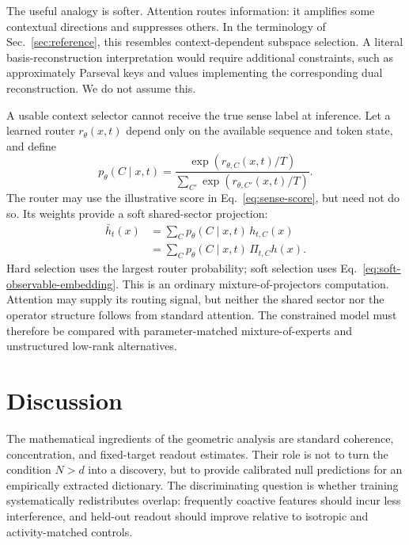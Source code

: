 \documentclass[
  aps,
  reprint,
  superscriptaddress,
  floatfix,
  nofootinbib,
  longbibliography
]{revtex4-2}
\newcommand{\Nsem}{N}
\begin{document}
The useful analogy is softer. Attention routes information: it amplifies
some contextual directions and suppresses others. In the terminology of
Sec.~\ref{sec:reference}, this resembles context-dependent subspace
selection. A literal basis-reconstruction interpretation would require
additional constraints, such as approximately Parseval keys and values
implementing the corresponding dual reconstruction. We do not assume this.

A usable context selector cannot receive the true sense label at inference.
Let a learned router $r_\theta(x,t)$ depend only on the available sequence and
token state, and define
%
\begin{equation}
\label{eq:context-temp}
p_\theta(C\mid x,t)=
\frac{\exp(r_{\theta,C}(x,t)/T)}
{\sum_{C'}\exp(r_{\theta,C'}(x,t)/T)} .
\end{equation}
%
The router may use the illustrative score in Eq.~\eqref{eq:sense-score}, but
need not do so.  Its weights provide a soft shared-sector projection:
%
\begin{equation}
\label{eq:soft-observable-embedding}
\begin{aligned}
\bar h_t(x)
&=\sum_C p_\theta(C\mid x,t)\,h_{t,C}(x)\\
&=\sum_C p_\theta(C\mid x,t)\,\Pi_{t,C}h(x).
\end{aligned}
\end{equation}
%
Hard selection uses the largest router probability; soft selection uses
Eq.~\eqref{eq:soft-observable-embedding}.  This is an ordinary
mixture-of-projectors computation.  Attention may supply its routing signal,
but neither the shared sector nor the operator structure follows from standard
attention.  The constrained model must therefore be compared with
parameter-matched mixture-of-experts and unstructured low-rank alternatives.

\section{Discussion}
\label{sec:discussion}

The mathematical ingredients of the geometric analysis are standard
coherence, concentration, and fixed-target readout estimates.  Their role is
not to turn the condition $\Nsem>d$ into a discovery, but to provide calibrated
null predictions for an empirically extracted dictionary.  The discriminating
question is whether training systematically redistributes overlap: frequently
coactive features should incur less interference, and held-out readout should
improve relative to isotropic and activity-matched controls.
\end{document}
